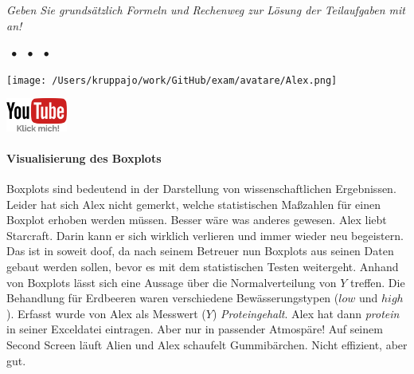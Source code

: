 \documentclass[a4paper, 9pt]{scrartcl}\usepackage[]{graphicx}\usepackage[]{xcolor}
\begin{document}
\textit{Geben Sie grundsätzlich Formeln und Rechenweg zur Lösung der Teilaufgaben mit an!} \\[1Ex]
 

 
\ifcollection
\begin{flushright}
\tiny\vspace{-3Ex}
\textbf{\examinhaltstart}
\exammodulemathstat $\;\bullet$
\exammodulestat $\;\bullet$
\exammodulelanddaten $\;\bullet$
\exammodulestatbbv 
\vspace{-4Ex}
\end{flushright}
\begin{minipage}[t]{0.5\textwidth}
\texttt{[image: /Users/kruppajo/work/GitHub/exam/avatare/Alex.png]}
\end{minipage}
\begin{minipage}[t]{0.5\textwidth}
\hfill
\href{https://youtu.be/ZbrvpCuZl_k}{\includegraphics[width = 2cm]{img/youtube}}
\end{minipage}
\vspace{-3ex}
\fi



\ifcollection
\paragraph{Visualisierung des Boxplots}
\fi

Boxplots sind bedeutend in der Darstellung von wissenschaftlichen Ergebnissen. Leider hat sich Alex nicht gemerkt, welche statistischen Maßzahlen für einen Boxplot erhoben werden müssen. Besser wäre was anderes gewesen. Alex liebt Starcraft. Darin kann er sich wirklich verlieren und immer wieder neu begeistern. Das ist in soweit doof, da nach seinem Betreuer nun Boxplots aus seinen Daten gebaut werden sollen, bevor es mit dem statistischen Testen weitergeht. Anhand von Boxplots lässt sich eine Aussage über die Normalverteilung von $Y$ treffen. Die Behandlung für Erdbeeren waren verschiedene Bewässerungstypen ($low$ und $high$). Erfasst wurde von Alex als Messwert ($Y$) \textit{Proteingehalt}. Alex hat dann \textit{protein} in seiner Exceldatei eintragen. Aber nur in passender Atmospäre! Auf seinem Second Screen läuft Alien und Alex schaufelt Gummibärchen. Nicht effizient, aber gut.
\end{document}
